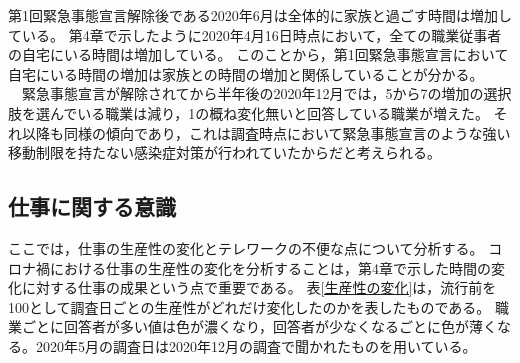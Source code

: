 \documentclass[paper={210mm,297mm},fontsize=15Q,line_length=35zw,number_of_lines=31,head_space=30mm,gutter=40mm,baselineskip=2.0zw,headfoot_verticalposition=1.5zw]{jlreq}
\begin{document}
第1回緊急事態宣言解除後である2020年6月は全体的に家族と過ごす時間は増加している。
第4章で示したように2020年4月16日時点において，全ての職業従事者の自宅にいる時間は増加している。
このことから，第1回緊急事態宣言において自宅にいる時間の増加は家族との時間の増加と関係していることが分かる。
　緊急事態宣言が解除されてから半年後の2020年12月では，5から7の増加の選択肢を選んでいる職業は減り，1の概ね変化無いと回答している職業が増えた。
それ以降も同様の傾向であり，これは調査時点において緊急事態宣言のような強い移動制限を持たない感染症対策が行われていたからだと考えられる。

\subsection{仕事に関する意識}

ここでは，仕事の生産性の変化とテレワークの不便な点について分析する。
コロナ禍における仕事の生産性の変化を分析することは，第4章で示した時間の変化に対する仕事の成果という点で重要である。
表\ref{生産性の変化}は，流行前を100として調査日ごとの生産性がどれだけ変化したのかを表したものである。
職業ごとに回答者が多い値は色が濃くなり，回答者が少なくなるごとに色が薄くなる。2020年5月の調査日は2020年12月の調査で聞かれたものを用いている。
\end{document}

